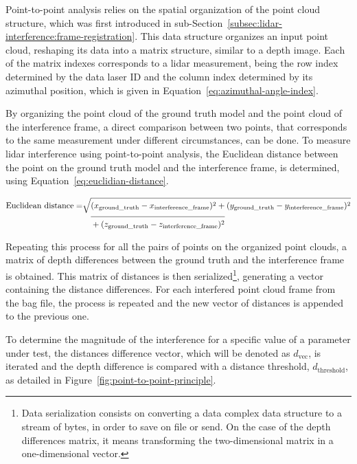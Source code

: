Point-to-point analysis relies on the spatial organization of the point cloud structure, which was first introduced in sub-Section~\ref{subsec:lidar-interference:frame-registration}. This data structure organizes an input point cloud, reshaping its data into a matrix structure, similar to a depth image. Each of the matrix indexes corresponds to a \ac{lidar} measurement, being the row index determined by the data \ac{laser} ID and the column index determined by its azimuthal position, which is given in Equation~\eqref{eq:azimuthal-angle-index}. 

By organizing the point cloud of the ground truth model and the point cloud of the interference frame, a direct comparison between two points, that corresponds to the same measurement under different circumstances, can be done. To measure \ac{lidar} interference using point-to-point analysis, the Euclidean distance between the point on the ground truth model and the interference frame, is determined, using Equation~\eqref{eq:euclidian-distance}.

\begin{equation}
\label{eq:euclidian-distance}
\begin{split}
\displaystyle
\text{Euclidean distance} = & \sqrt{(x_{\text{ground\_truth}} - x_{\text{interference\_frame}})^2 + (y_{\text{ground\_truth}} - y_{\text{interference\_frame}})^2} \\
														& \displaystyle \quad \overline{\rule{0pt}{2.5ex} + (z_{\text{ground\_truth}} - z_{\text{interference\_frame}})^2 }
\end{split}
\end{equation}

Repeating this process for all the pairs of points on the organized point clouds, a matrix of depth differences between the ground truth and the interference frame is obtained. This matrix of distances is then serialized\footnote{Data serialization consists on converting a data complex data structure to a stream of bytes, in order to save on file or send. On the case of the depth differences matrix, it means transforming the two-dimensional matrix in a one-dimensional vector.}, generating a vector containing the distance differences. For each interfered point cloud frame from the bag file, the process is repeated and the new vector of distances is appended to the previous one. 

To determine the magnitude of the interference for a specific value of a parameter under test, the distances difference vector, which will be denoted as $d_\text{vec}$, is iterated and the depth difference is compared with a distance threshold, $d_\text{threshold}$, as detailed in Figure~\ref{fig:point-to-point-principle}. 

